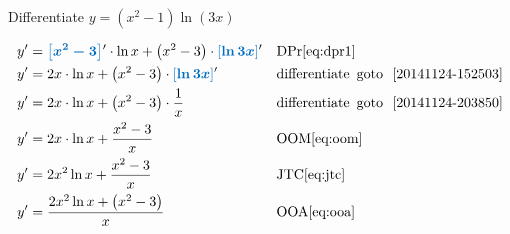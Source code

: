\begin{example}[id:20141124-205219] \label{20141124-205219} \hfill \\

Differentiate $y=\left(x^2-1 \right) \ln(3x)$

\soln

\solnsteps
\begin{align*}
y' &= \farg{x^2-3}' \cdot \ln x + \left(x^2-3\right) \cdot \farg{\ln 3x}' && \text{DPr} \eqref{eq:dpr1} \\
y' &= 2x \cdot \ln x + \left(x^2-3\right) \cdot \farg{\ln 3x}' && \text{differentiate} \text{\, goto \,} \, \ref{20141124-152503} \\
y' &= 2x \cdot \ln x + \left(x^2-3\right) \cdot \dfrac{1}{x}  &&\text{differentiate} \text{\, goto \,} \, \ref{20141124-203850}\\
y' &= 2x \cdot \ln x + \dfrac{x^2-3}{x} && \text{OOM} \eqref{eq:oom} \\
y' &= 2x^2 \ln x +\dfrac{x^2-3}{x} && \text{JTC} \eqref{eq:jtc} \\
y' &= \dfrac{2x^2 \ln x + \left(x^2-3\right)}{x} && \text{OOA} \eqref{eq:ooa} 
\end{align*}
\end{example}



